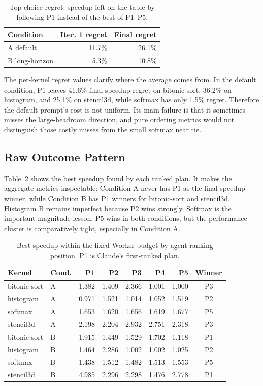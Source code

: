 \documentclass[conference]{IEEEtran}
\begin{document}
\begin{table}[t]
\centering
\caption{Top-choice regret: speedup left on the table by following P1 instead
of the best of P1--P5.}
\label{tab:regret}
\scriptsize
\begin{tabular}{lrr}
\toprule
\textbf{Condition} & \textbf{Iter. 1 regret} & \textbf{Final regret} \\
\midrule
A default & 11.7\% & 26.1\% \\
B long-horizon & 5.3\% & 10.8\% \\
\bottomrule
\end{tabular}
\end{table}

The per-kernel regret values clarify where the average comes from. In the
default condition, P1 leaves 41.6\% final-speedup regret on bitonic-sort,
36.2\% on histogram, and 25.1\% on stencil3d, while softmax has only 1.5\%
regret. Therefore the default prompt's cost is not uniform. Its main failure is
that it sometimes misses the large-headroom direction, and pure ordering
metrics would not distinguish those costly misses from the small softmax near
tie.

\subsection{Raw Outcome Pattern}

Table~\ref{tab:rawpeak} shows the best speedup found by each ranked plan. It
makes the aggregate metrics inspectable: Condition A never has P1 as the
final-speedup winner, while Condition B has P1 winners for bitonic-sort and
stencil3d. Histogram B remains imperfect because P2 wins strongly. Softmax is
the important magnitude lesson: P5 wins in both conditions, but the performance
cluster is comparatively tight, especially in Condition A.

\begin{table}[t]
\centering
\caption{Best speedup within the fixed Worker budget by agent-ranking
position. P1 is Claude's first-ranked plan.}
\label{tab:rawpeak}
\scriptsize
\begin{tabular}{llrrrrrc}
\toprule
\textbf{Kernel} & \textbf{Cond.} & \textbf{P1} & \textbf{P2} &
\textbf{P3} & \textbf{P4} & \textbf{P5} & \textbf{Winner} \\
\midrule
bitonic-sort & A & 1.382 & 1.409 & 2.366 & 1.001 & 1.000 & P3 \\
histogram    & A & 0.971 & 1.521 & 1.014 & 1.052 & 1.519 & P2 \\
softmax      & A & 1.653 & 1.620 & 1.656 & 1.619 & 1.677 & P5 \\
stencil3d    & A & 2.198 & 2.204 & 2.932 & 2.751 & 2.318 & P3 \\
bitonic-sort & B & 1.915 & 1.449 & 1.529 & 1.702 & 1.118 & P1 \\
histogram    & B & 1.464 & 2.286 & 1.002 & 1.002 & 1.025 & P2 \\
softmax      & B & 1.438 & 1.512 & 1.482 & 1.513 & 1.553 & P5 \\
stencil3d    & B & 4.985 & 2.296 & 2.298 & 1.476 & 2.778 & P1 \\
\bottomrule
\end{tabular}
\end{table}
\end{document}
